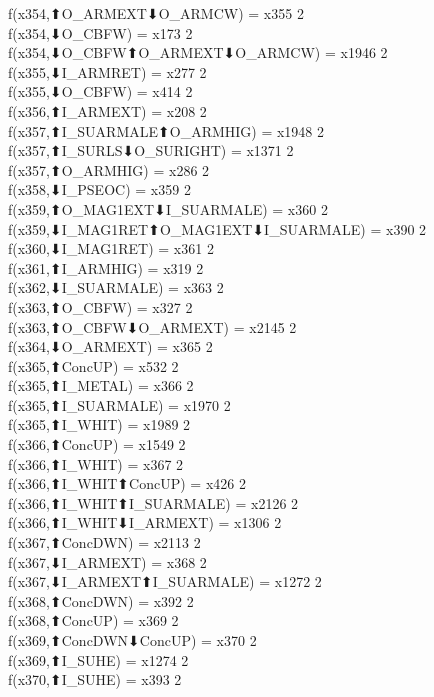 f(x354,⬆O_ARMEXT⬇O_ARMCW) = x355 {2} \\
f(x354,⬇O_CBFW) = x173 {2} \\
f(x354,⬇O_CBFW⬆O_ARMEXT⬇O_ARMCW) = x1946 {2} \\
f(x355,⬇I_ARMRET) = x277 {2} \\
f(x355,⬇O_CBFW) = x414 {2} \\
f(x356,⬆I_ARMEXT) = x208 {2} \\
f(x357,⬆I_SUARMALE⬆O_ARMHIG) = x1948 {2} \\
f(x357,⬆I_SURLS⬇O_SURIGHT) = x1371 {2} \\
f(x357,⬆O_ARMHIG) = x286 {2} \\
f(x358,⬇I_PSEOC) = x359 {2} \\
f(x359,⬆O_MAG1EXT⬇I_SUARMALE) = x360 {2} \\
f(x359,⬇I_MAG1RET⬆O_MAG1EXT⬇I_SUARMALE) = x390 {2} \\
f(x360,⬇I_MAG1RET) = x361 {2} \\
f(x361,⬆I_ARMHIG) = x319 {2} \\
f(x362,⬇I_SUARMALE) = x363 {2} \\
f(x363,⬆O_CBFW) = x327 {2} \\
f(x363,⬆O_CBFW⬇O_ARMEXT) = x2145 {2} \\
f(x364,⬇O_ARMEXT) = x365 {2} \\
f(x365,⬆ConcUP) = x532 {2} \\
f(x365,⬆I_METAL) = x366 {2} \\
f(x365,⬆I_SUARMALE) = x1970 {2} \\
f(x365,⬆I_WHIT) = x1989 {2} \\
f(x366,⬆ConcUP) = x1549 {2} \\
f(x366,⬆I_WHIT) = x367 {2} \\
f(x366,⬆I_WHIT⬆ConcUP) = x426 {2} \\
f(x366,⬆I_WHIT⬆I_SUARMALE) = x2126 {2} \\
f(x366,⬆I_WHIT⬇I_ARMEXT) = x1306 {2} \\
f(x367,⬆ConcDWN) = x2113 {2} \\
f(x367,⬇I_ARMEXT) = x368 {2} \\
f(x367,⬇I_ARMEXT⬆I_SUARMALE) = x1272 {2} \\
f(x368,⬆ConcDWN) = x392 {2} \\
f(x368,⬆ConcUP) = x369 {2} \\
f(x369,⬆ConcDWN⬇ConcUP) = x370 {2} \\
f(x369,⬆I_SUHE) = x1274 {2} \\
f(x370,⬆I_SUHE) = x393 {2} \\
